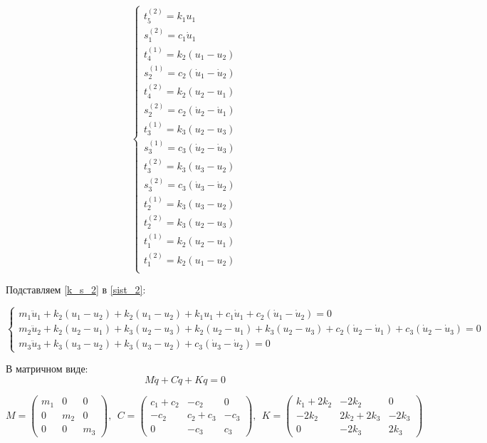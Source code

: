 \documentclass[a4paper, 12pt]{article}
\begin{document}
\begin{equation} \label{k_s_2} 
\begin{cases}
t_5^{(2)} = k_1 u_1\\
s_1^{(2)} = c_1 \dot u_1\\
t_4^{(1)} = k_2 (u_1 - u_2)\\
s_2^{(1)} = c_2 (\dot u_1 - \dot u_2)\\
t_4^{(2)} = k_2 (u_2 - u_1)\\
s_2^{(2)} = c_2 (\dot u_2 - \dot u_1)\\
t_3^{(1)} = k_3 (u_2 - u_3)\\
s_3^{(1)} = c_3 (\dot u_2 - \dot u_3)\\
t_3^{(2)} = k_3 (u_3 - u_2)\\
s_3^{(2)} = c_3 (\dot u_3 - \dot u_2)\\
t_2^{(1)} = k_3 (u_3 - u_2)\\
t_2^{(2)} = k_3 (u_2 - u_3)\\
t_1^{(1)} = k_2 (u_2 - u_1)\\
t_1^{(2)} = k_2 (u_1 - u_2)\\
\end{cases}
\end{equation}

Подставляем \eqref{k_s_2} в \eqref{sist_2}:

\[
\begin{cases}
m_1\ddot u_1 + k_2 (u_1 - u_2) + k_2 (u_1 - u_2) + k_1 u_1 + c_1 \dot u_1 + c_2 (\dot u_1 - \dot u_2) = 0\\
m_2\ddot u_2 + k_2 (u_2 - u_1) + k_3 (u_2 - u_3) + k_2 (u_2 - u_1) + k_3 (u_2 - u_3)  + c_2 (\dot u_2 - \dot u_1) + c_3 (\dot u_2 - \dot u_3) = 0\\
m_3\ddot u_3 + k_3 (u_3 - u_2) + k_3 (u_3 - u_2) + c_3 (\dot u_3 - \dot u_2) = 0 
\end{cases}
\]

В матричном виде:
\[
M \ddot q + C \dot q + K q = 0
\]

\[
M = \begin{pmatrix}
m_1 & 0 & 0 \\
0 & m_2 & 0\\
0 & 0 & m_3
\end{pmatrix},\ \ 
C = \begin{pmatrix}
c_1 + c_2 & -c_2 & 0  \\
-c_2 & c_2 + c_3 & -c_3\\
0 & -c_3 & c_3
\end{pmatrix},\ \ 
K = \begin{pmatrix}
k_1 + 2k_2 & -2k_2 & 0 \\
-2k_2 & 2k_2 + 2k_3 & -2k_3\\
0 & -2k_3 & 2k_3
\end{pmatrix}
\]
\end{document}
